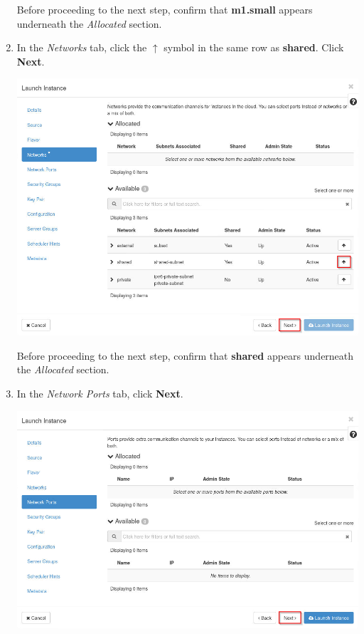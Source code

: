 \documentclass[letterpaper, 12pt]{article}
\begin{document}
\begin{enumerate}
    \begin{stopbox}
        Before proceeding to the next step, confirm that \textbf{m1.small} appears underneath the \textit{Allocated}
        section.
    \end{stopbox}

    \item In the \textit{Networks} tab, click the $\uparrow$ symbol in the same row as \textbf{shared}. Click
    \textbf{Next}.

    \begin{center}
        \includegraphics[width=\linewidth]{images/part1/step22.png}
    \end{center}

    \begin{stopbox}
        Before proceeding to the next step, confirm that \textbf{shared} appears underneath the \textit{Allocated}
        section.
    \end{stopbox}

    \item In the \textit{Network Ports} tab, click \textbf{Next}.
    
    \begin{center}
        \includegraphics[width=\linewidth]{images/part1/step23.png}
    \end{center}


\end{enumerate}
\end{document}
